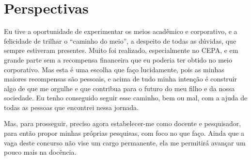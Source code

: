 \chapter{Perspectivas}

Eu tive a oportunidade de experimentar os meios acadêmico e corporativo, e a felicidade de trilhar o ``caminho do meio'', a despeito de todas as dúvidas, que sempre estiveram presentes. Muito foi realizado, especialmente no CEPA, e em grande parte sem a recompensa financeira que eu poderia ter obtido no meio corporativo. Mas esta é uma escolha que faço lucidamente, pois as minhas maiores recompensas são pessoais, e acima de tudo minha intenção é construir algo de que me orgulhe e que contribua para o futuro do meu filho e da nossa sociedade. Eu tenho conseguido seguir esse caminho, bem ou mal, com a ajuda de todas as pessoas que encontrei nessa jornada.

Mas, para prosseguir, preciso agora estabelecer-me como docente e pesquisador, para então propor minhas próprias pesquisas, com foco no que faço. Ainda que a vaga deste concurso não vise um cargo permanente, ela me permitirá avançar um pouco mais na docência.

